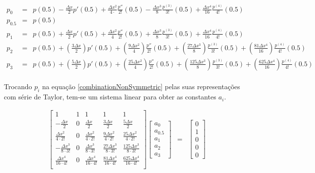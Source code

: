 \documentclass[introducao.tex]{subfiles}
\begin{document}
\begin{eqnarray}
p_0 & = & p(0.5) - \frac{\Delta x}{2}p'(0.5) + \frac{\Delta x^2}{4\cdot}\frac{p''}{2!}(0.5) - \frac{\Delta x^3}{8} \frac{p^{(3)}}{3!}(0.5) + \frac{\Delta x^4}{16} \frac{p^{(4)}}{4!}(0.5) \nonumber\\
p_{0.5} & = & p(0.5) \nonumber \\
p_1 & = & p(0.5) + \frac{\Delta x}{2}p'(0.5) + \frac{\Delta x^2}{4}\frac{p''}{2!}(0.5) + \frac{\Delta x^3}{8} \frac{p^{(3)}}{3!}(0.5) + \frac{\Delta x^4}{16} \frac{p^{(4)}}{4!}(0.5)\nonumber \\
p_2 & = & p(0.5) + \left(\frac{3\Delta x}{2}\right)p'(0.5) + \left(\frac{9\Delta x^2}{4}\right)\frac{p''}{2!}(0.5) + \left(\frac{27\Delta x^3}{8}\right)\frac{p^{(3)}}{3!}(0.5)+\left(\frac{81\Delta x^4}{16}\right)\frac{p^{(4)}}{4!}(0.5)\nonumber\\
p_3 & = & p(0.5) + \left(\frac{5\Delta x}{2}\right)p'(0.5) + \left(\frac{25\Delta x^2}{4}\right)\frac{p''}{2!}(0.5) + \left(\frac{125\Delta x^3}{8}\right)\frac{p^{(3)}}{3!}(0.5)+\left(\frac{625\Delta x^4}{16}\right)\frac{p^{(4)}}{4!} (0.5)\nonumber
\end{eqnarray}
 
\paragraph{} Trocando $p_i$ na equação \ref{combinationNonSymmetric} pelas suas representações com série de Taylor, tem-se um sistema linear para obter as constantes $a_i$.

\begin{eqnarray}
\left[\begin{array}{ccccc}
1 & 1 & 1 & 1 & 1\\
-\frac{\Delta x}{2} & 0 & \frac{\Delta x}{2} & \frac{3\Delta x}{2} & \frac{5\Delta x}{2}\\
\frac{\Delta x^2}{4\cdot 2!} & 0 & \frac{\Delta x^2}{4\cdot 2!} & \frac{9\Delta x^2}{4\cdot 2!} & \frac{25\Delta x^2}{4\cdot 2!}\\
-\frac{\Delta x^3}{8\cdot 3!} & 0 & \frac{\Delta x^3}{8\cdot 3!} & \frac{27\Delta x^3}{8\cdot 3!} & \frac{125\Delta x^3}{8\cdot 3!}\\
\frac{\Delta x^4}{16\cdot 4!} & 0 & \frac{\Delta x^4}{16\cdot 4!} & \frac{81\Delta x^4}{16\cdot 4!} & \frac{625\Delta x^4}{16\cdot 4!}\\
\end{array}\right]\left[\begin{array}{c}a_0\\ a_{0.5}\\ a_1\\ a_2\\ a_3\end{array}\right] & = & \left[\begin{array}{c}0\\ 1\\ 0\\ 0\\ 0\end{array}\right]
\end{eqnarray}
\end{document}
